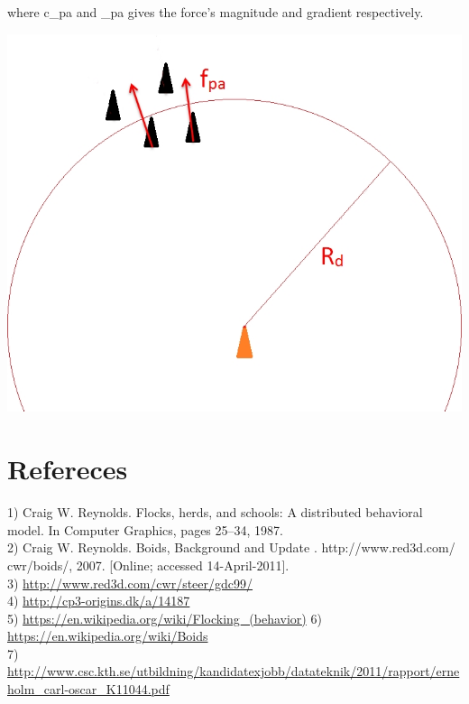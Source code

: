 \documentclass{article}
\begin{document}
where c_{pa} and \omega _{pa} gives the force's magnitude and gradient respectively.
\begin{center}
\includegraphics[scale=0.4]{fig3.png} 
\end{center}

\pagebreak

\section{Refereces}
1) Craig W. Reynolds. Flocks, herds, and schools: A distributed behavioral model. In Computer Graphics, pages 25–34, 1987.\\
2) Craig W. Reynolds. Boids, Background and Update . http://www.red3d.com/ cwr/boids/, 2007. [Online; accessed 14-April-2011]. \\
3) \href{http://www.red3d.com/cwr/steer/gdc99/}{http://www.red3d.com/cwr/steer/gdc99/}\\
4) \href{http://cp3-origins.dk/a/14187}{http://cp3-origins.dk/a/14187}\\
5) \href{https://en.wikipedia.org/wiki/Flocking_(behavior)}{https://en.wikipedia.org/wiki/Flocking_(behavior)}
6) \href{https://en.wikipedia.org/wiki/Boids}{https://en.wikipedia.org/wiki/Boids}\\
7) \href{http://www.csc.kth.se/utbildning/kandidatexjobb/datateknik/2011/rapport/erneholm_carl-oscar_K11044.pdf}{http://www.csc.kth.se/utbildning/kandidatexjobb/datateknik/2011/rapport/erneholm_carl-oscar_K11044.pdf}
\end{document}

